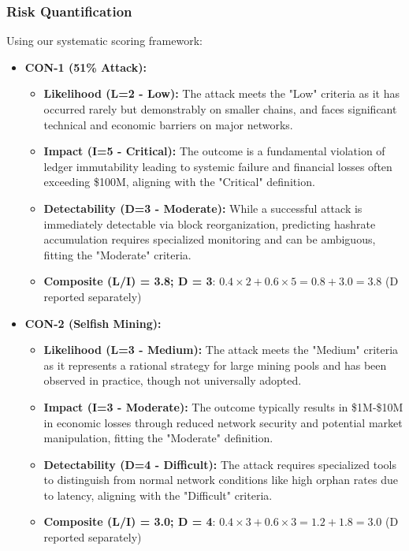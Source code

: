 \subsubsection{Risk Quantification}

Using our systematic scoring framework:

\begin{itemize}
    \item \textbf{CON-1 (51\% Attack):}
    \begin{itemize}
        \item \textbf{Likelihood (L=2 - Low):} The attack meets the "Low" criteria as it has occurred rarely but demonstrably on smaller chains, and faces significant technical and economic barriers on major networks.
        \item \textbf{Impact (I=5 - Critical):} The outcome is a fundamental violation of ledger immutability leading to systemic failure and financial losses often exceeding \$100M, aligning with the "Critical" definition.
        \item \textbf{Detectability (D=3 - Moderate):} While a successful attack is immediately detectable via block reorganization, predicting hashrate accumulation requires specialized monitoring and can be ambiguous, fitting the "Moderate" criteria.
        \item \textbf{Composite (L/I) = 3.8; D = 3}: $0.4 \times 2 + 0.6 \times 5 = 0.8 + 3.0 = 3.8$ (D reported separately)
    \end{itemize}
    
    \item \textbf{CON-2 (Selfish Mining):}
    \begin{itemize}
        \item \textbf{Likelihood (L=3 - Medium):} The attack meets the "Medium" criteria as it represents a rational strategy for large mining pools and has been observed in practice, though not universally adopted.
        \item \textbf{Impact (I=3 - Moderate):} The outcome typically results in \$1M-\$10M in economic losses through reduced network security and potential market manipulation, fitting the "Moderate" definition.
        \item \textbf{Detectability (D=4 - Difficult):} The attack requires specialized tools to distinguish from normal network conditions like high orphan rates due to latency, aligning with the "Difficult" criteria.
        \item \textbf{Composite (L/I) = 3.0; D = 4}: $0.4 \times 3 + 0.6 \times 3 = 1.2 + 1.8 = 3.0$ (D reported separately)
    \end{itemize}


\end{itemize}
